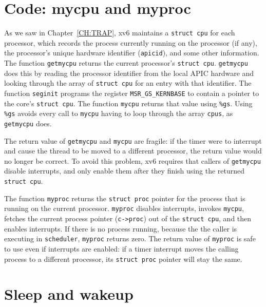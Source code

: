 \section{Code: mycpu and myproc}

As we saw in Chapter~\ref{CH:TRAP},
xv6 maintains a
\lstinline{struct cpu}
for each processor, which records
the process currently running
on the processor (if any),
the processor's unique hardware identifier
(\lstinline{apicid}),
and some other information.
The function
\lstinline{getmycpu}
returns the current processor's
\lstinline{struct cpu}.
\lstinline{getmycpu}
does this by reading the processor
identifier from the local APIC hardware and looking through
the array of
\lstinline{struct cpu}
for an entry with that identifier.
The function 
\lstinline{seginit}
programs the register
\lstinline{MSR_GS_KERNBASE}
to contain a pointer to the core's
\lstinline{struct cpu}.
The function
\lstinline{mycpu}
returns that
value using
\texttt{\%gs}.
Using
\texttt{\%gs}
avoids every call to
\lstinline{mycpu}
having to loop
through the array
\lstinline{cpus},
as
\lstinline{getmycpu}
does.

The return value of
\lstinline{getmycpu}
and
\lstinline{mycpu}
are fragile: if the timer were to interrupt and cause
the thread to be moved to a different processor, the
return value would no longer be correct.
To avoid this problem, xv6 requires that callers of
\lstinline{getmycpu}
disable interrupts, and only enable
them after they finish using the returned
\lstinline{struct cpu}.

The function
\lstinline{myproc}
returns the
\lstinline{struct proc}
pointer
for the process that is running on the current processor.
\lstinline{myproc}
disables interrupts, invokes
\lstinline{mycpu},
fetches the current process pointer
(\lstinline{c->proc})
out of the
\lstinline{struct cpu},
and then enables interrupts.
If there is no process running, because the the caller is
executing in
\lstinline{scheduler},
\lstinline{myproc}
returns zero.
The return value of
\lstinline{myproc}
is safe to use even if interrupts are enabled:
if a timer interrupt moves the calling process to a
different processor, its
\lstinline{struct proc}
pointer will stay the same.
\section{Sleep and wakeup}

